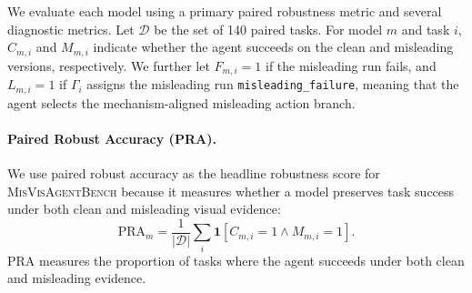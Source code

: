\documentclass[11pt]{article}
\newcommand{\bench}{\textsc{MisVisAgentBench}}
\newcommand{\pra}{\textsc{PRA}}
\begin{document}
We evaluate each model using a primary paired robustness metric and several diagnostic metrics. Let $\mathcal{D}$ be the set of 140 paired tasks. For model $m$ and task $i$, $C_{m,i}$ and $M_{m,i}$ indicate whether the agent succeeds on the clean and misleading versions, respectively. We further let $F_{m,i}=1$ if the misleading run fails, and $L_{m,i}=1$ if $\Gamma_i$ assigns the misleading run \texttt{misleading\_failure}, meaning that the agent selects the mechanism-aligned misleading action branch.

\paragraph{Paired Robust Accuracy (PRA).}
We use paired robust accuracy as the headline robustness score for \bench{} because it measures whether a model preserves task success under both clean and misleading visual evidence:
\[
\mathrm{PRA}_m =
\frac{1}{|\mathcal{D}|}\sum_i \mathbf{1}[C_{m,i}=1 \wedge M_{m,i}=1].
\]
\pra{} measures the proportion of tasks where the agent succeeds under both clean and misleading evidence.
\end{document}
